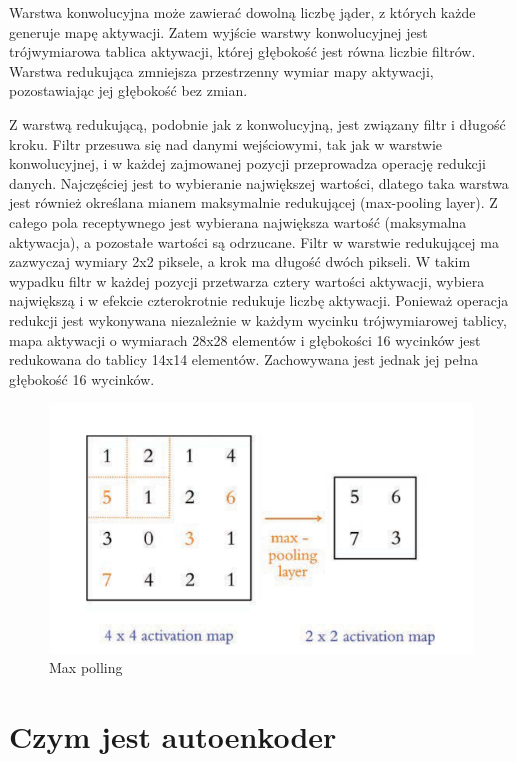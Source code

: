 \documentclass[12pt]{mwbk}
\theoremstyle{plain}
\theoremstyle{definition}
\theoremstyle{remark}
\newcommand\zrodlo[1]{\par\vspace{-3mm}{\small\textit{Źródło: }#1 }}
\begin{document}
	Warstwa konwolucyjna może zawierać dowolną liczbę jąder, z których każde generuje mapę aktywacji. Zatem wyjście warstwy konwolucyjnej jest trójwymiarowa tablica aktywacji, której głębokość jest równa liczbie filtrów. Warstwa redukująca zmniejsza przestrzenny wymiar mapy aktywacji, pozostawiając jej głębokość bez zmian.
	
	Z warstwą redukującą, podobnie jak z konwolucyjną, jest związany filtr i długość kroku. Filtr przesuwa się nad danymi wejściowymi, tak jak w warstwie konwolucyjnej, i w każdej zajmowanej pozycji przeprowadza operację redukcji danych. Najczęściej jest to wybieranie największej wartości, dlatego taka warstwa jest również określana mianem maksymalnie redukującej (max-pooling layer). Z całego pola receptywnego jest wybierana największa wartość (maksymalna aktywacja), a pozostałe wartości są odrzucane. Filtr w warstwie redukującej ma zazwyczaj wymiary 2x2 piksele, a krok ma długość dwóch pikseli. W takim wypadku filtr w każdej pozycji przetwarza cztery wartości aktywacji, wybiera największą i w efekcie czterokrotnie redukuje liczbę aktywacji. Ponieważ operacja redukcji jest wykonywana niezależnie w każdym wycinku trójwymiarowej tablicy, mapa aktywacji o wymiarach 28x28 elementów i głębokości 16 wycinków jest redukowana do tablicy 14x14 elementów. Zachowywana jest jednak jej pełna głębokość 16 wycinków.
	
	\begin{figure}[!h]
		\centering
		\includegraphics[width=\linewidth]{rys/max-polling.png}
		\caption{Max polling}
		\zrodlo{\cite{illustrated}}
		\label{fig:max-polling}
	\end{figure}
	
\section{Czym jest autoenkoder}
\end{document}
